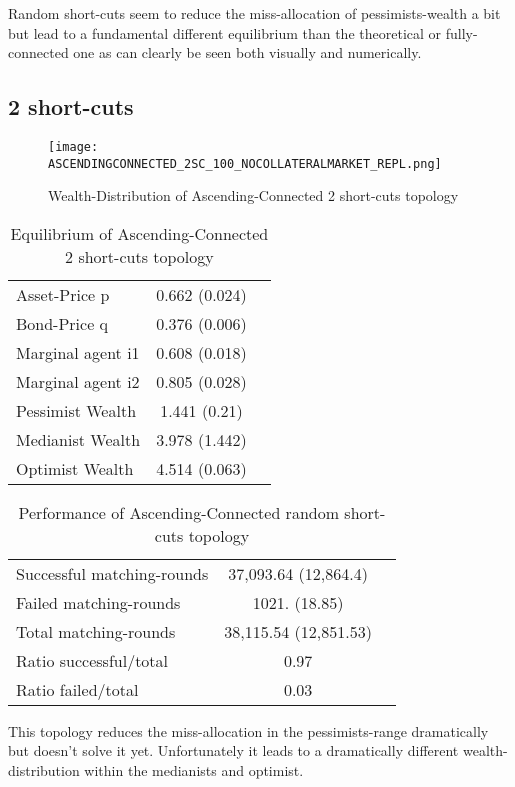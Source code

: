 \documentclass[Bachelorarbeit.tex]{subfiles}
\begin{document}
Random short-cuts seem to reduce the miss-allocation of pessimists-wealth a bit but lead to a fundamental different equilibrium than the theoretical or fully-connected one as can clearly be seen both visually and numerically.

\subsection{2 short-cuts}
\begin{figure}[H]
	\centering
  \texttt{[image: ASCENDINGCONNECTED\_2SC\_100\_NOCOLLATERALMARKET\_REPL.png]}
	\caption{Wealth-Distribution of Ascending-Connected 2 short-cuts topology}
	\label{fig:wealth_ASCENDINGCONNECTED_2SC_100_NOCOLLATERALMARKET_REPL}
\end{figure}

\begin{table}[H]
	\caption{Equilibrium of Ascending-Connected 2 short-cuts topology}
	\centering
	\begin{tabular} { l c r }
		\hline
		Asset-Price p & 0.662 (0.024) \\
		Bond-Price q & 0.376 (0.006) \\
		Marginal agent i1 & 0.608 (0.018) \\
		Marginal agent i2 & 0.805 (0.028) \\
		\hline
		Pessimist Wealth & 1.441 (0.21) \\
		Medianist Wealth & 3.978 (1.442) \\
		Optimist Wealth & 4.514 (0.063) \\
		\hline
	\end{tabular}
\end{table} 

\begin{table}[H]
	\caption{Performance of Ascending-Connected random short-cuts topology}
	\centering
	\begin{tabular} { l c r }
		\hline
		Successful matching-rounds& 37,093.64 (12,864.4) \\
		Failed matching-rounds & 1021. (18.85) \\
		Total matching-rounds & 38,115.54 (12,851.53) \\
		\hline
		Ratio successful/total & 0.97 \\
		Ratio failed/total & 0.03 \\
		\hline
	\end{tabular}
\end{table}

This topology reduces the miss-allocation in the pessimists-range dramatically but doesn't solve it yet. Unfortunately it leads to a dramatically different wealth-distribution within the medianists and optimist.
\end{document}
